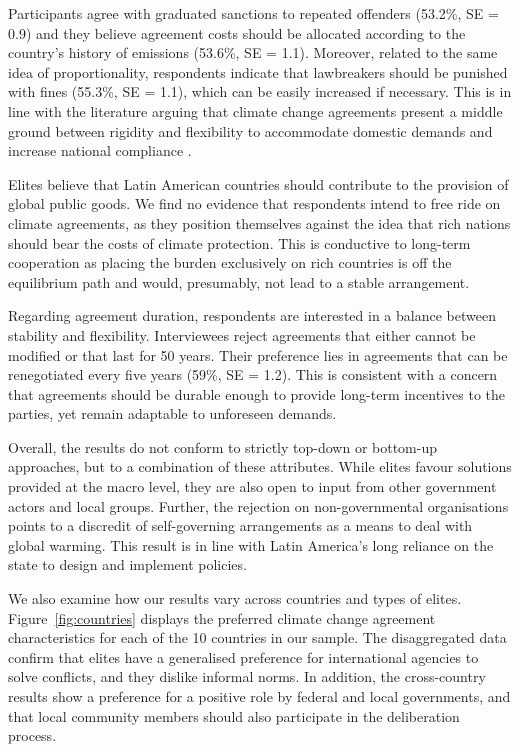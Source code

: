 \documentclass[a4paper,12pt]{article}
\begin{document}
Participants agree with graduated sanctions to repeated offenders (53.2\%, SE = 0.9) and they believe agreement costs should be allocated according to the country's history of emissions (53.6\%, SE = 1.1). Moreover, related to the same idea of proportionality, respondents indicate that lawbreakers should be punished with fines (55.3\%, SE = 1.1), which can be easily increased if necessary. This is in line with the literature arguing that climate change agreements present a middle ground between rigidity and flexibility to accommodate domestic demands and increase national compliance \citep{von2008international}.

Elites believe that Latin American countries should contribute to the provision of global public goods. We find no evidence that respondents intend to free ride on climate agreements, as they position themselves against the idea that rich nations should bear the costs of climate protection. This is conductive to long-term cooperation as placing the burden exclusively on rich countries is off the equilibrium path and would, presumably, not lead to a stable arrangement. 

Regarding agreement duration, respondents are interested in a balance between stability and flexibility. Interviewees reject agreements that either cannot be modified or that last for 50 years. Their preference lies in agreements that can be renegotiated every five years (59\%, SE = 1.2). This is consistent with a concern that agreements should be durable enough to provide long-term incentives to the parties, yet remain adaptable to unforeseen demands.

Overall, the results do not conform to strictly top-down or bottom-up approaches, but to a combination of these attributes. While elites favour solutions provided at the macro level, they are also open to input from other government actors and local groups. Further, the rejection on non-governmental organisations points to a discredit of self-governing arrangements as a means to deal with global warming. This result is in line with Latin America's long reliance on the state to design and implement policies.

We also examine how our results vary across countries and types of elites. Figure~\ref{fig:countries} displays the preferred climate change agreement characteristics for each of the 10 countries in our sample. The disaggregated data confirm that elites have a generalised preference for international agencies to solve conflicts, and they dislike informal norms. In addition, the cross-country results show a preference for a positive role by federal and local governments, and that local community members should also participate in the deliberation process.
\end{document}
